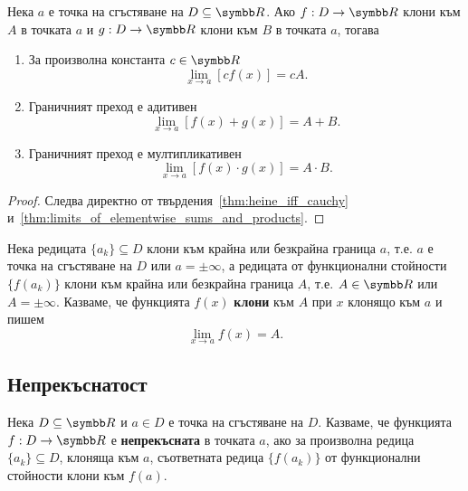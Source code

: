 \documentclass[numbers=endperiod, bibliography=totocnumbered]{scrartcl}
\begin{document}
\begin{proposition}\label{thm:limit_is_linear_and_multiplicative}
  Нека \( a \) е точка на сгъстяване на \( D \subseteq \R \). Ако \( f: D \to \R \) клони към \( A \) в точката \( a \) и \( g: D \to \R \) клони към \( B \) в точката \( a \), тогава
  \begin{enumerate}
    \item За произволна константа \( c \in \R \)
    \begin{equation*}
      \lim_{x \to a} [c f(x)] = c A.
    \end{equation*}

    \item Граничният преход е адитивен
    \begin{equation*}
      \lim_{x \to a} [f(x) + g(x)] = A + B.
    \end{equation*}

    \item Граничният преход е мултипликативен
    \begin{equation*}
      \lim_{x \to a} [f(x) \cdot g(x)] = A \cdot B.
    \end{equation*}
  \end{enumerate}
\end{proposition}
\begin{proof}
  Следва директно от твърдения~\ref{thm:heine_iff_cauchy} и~\ref{thm:limits_of_elementwise_sums_and_products}.
\end{proof}

\begin{definition}
  Нека редицата \( \{ a_k \} \subseteq D \) клони към крайна или безкрайна граница \( a \), т.е. \( a \) е точка на сгъстяване на \( D \) или \( a = \pm \infty \), а редицата от функционални стойности \( \{ f(a_k) \} \) клони към крайна или безкрайна граница \( A \), т.е. \( A \in \R \) или \( A = \pm \infty \). Казваме, че функцията \( f(x) \) \textbf{клони} към \( A \) при \( x \) клонящо към \( a \) и пишем
  \begin{equation*}
    \lim_{x \to a} f(x) = A.
  \end{equation*}
\end{definition}

\subsection{Непрекъснатост}

\begin{definition}
  Нека \( D \subseteq \R \) и \( a \in D \) е точка на сгъстяване на \( D \). Казваме, че функцията \( f: D \to \R \) е \textbf{непрекъсната} в точката \( a \), ако за произволна редица \( \{ a_k \} \subseteq D \), клоняща към \( a \), съответната редица \( \{ f(a_k) \} \) от функционални стойности клони към \( f(a) \).
\end{definition}
\end{document}

